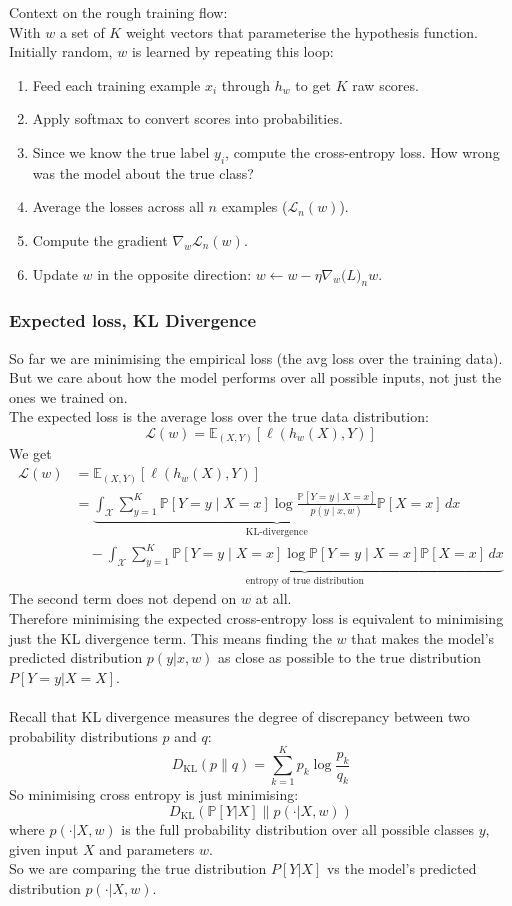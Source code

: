 \documentclass[../Probability.tex]{subfiles}
\begin{document}
Context on the rough training flow:\\
With $w$ a set of $K$ weight vectors that parameterise the hypothesis function. Initially random, $w$ is learned by repeating this loop:
\begin{enumerate}
    \item Feed each training example $x_i$ through $h_w$ to get $K$ raw scores.
    \item Apply softmax to convert scores into probabilities.
    \item Since we know the true label $y_i$, compute the cross-entropy loss. How wrong was the model about the true class?
    \item Average the losses across all $n$ examples ($\mathcal{L}_n(w)$).
    \item Compute the gradient $\nabla_w \mathcal{L}_n(w)$.
    \item Update $w$ in the opposite direction: $w \leftarrow w - \eta\nabla_w \mathcal(L)_n w$.
\end{enumerate}

\subsubsection{Expected loss, KL Divergence}
So far we are minimising the empirical loss (the avg loss over the training data).\\
But we care about how the model performs over all possible inputs, not just the ones we trained on.\\
The expected loss is the average loss over the true data distribution:
$$\mathcal{L}(w) = \mathbb{E}_{(X,Y)}[\ell(h_w(X), Y)]$$
We get
\begin{align*}
\mathcal{L}(w) &= \mathbb{E}_{(X,Y)}[\ell (h_w (X), Y)]\\
&= \underbrace{\int_{\mathcal{X}} \sum_{y=1}^{K} 
\mathbb{P}[Y=y \mid X=x] \log \frac{\mathbb{P}[Y=y \mid X=x]}{p(y \mid x,w)} 
\mathbb{P}[X=x] \, dx}_{\text{KL-divergence}} \\
&\quad - \underbrace{\int_{\mathcal{X}} \sum_{y=1}^{K} \mathbb{P}[Y=y \mid X=x] 
\log \mathbb{P}[Y=y \mid X=x] \mathbb{P}[X=x] \, dx}_{\text{entropy of true distribution}}
\end{align*}
The second term does not depend on $w$ at all.\\
Therefore minimising the expected cross-entropy loss is equivalent to minimising just the KL divergence term.
This means finding the $w$ that makes the model's predicted distribution $p(y|x,w)$ as close as possible to the true distribution $P[Y=y|X=X]$.\\
\\
Recall that KL divergence measures the degree of discrepancy between two probability distributions $p$ and $q$:
$$D_{\text{KL}}(p \| q) = \sum_{k=1}^{K} p_k \log \frac{p_k}{q_k}$$
So minimising cross entropy is just minimising:
$$D_{\text{KL}}(\mathbb{P}[Y|X] \| p(\cdot | X, w))$$
where $p(\cdot | X, w)$ is the full probability distribution over all possible classes $y$, given input $X$ and parameters $w$.\\
So we are comparing the true distribution $P[Y|X]$ vs the model's predicted distribution $p(\cdot | X, w)$.
\end{document}
